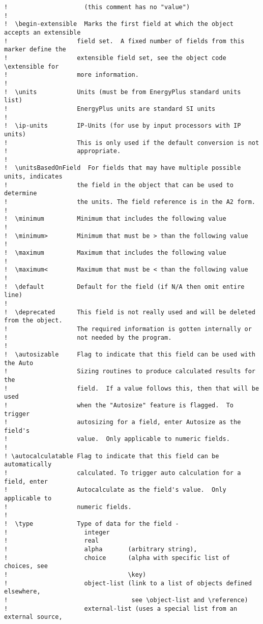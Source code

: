 \begin{lstlisting}
!                     (this comment has no "value")
!
!  \begin-extensible  Marks the first field at which the object accepts an extensible
!                   field set.  A fixed number of fields from this marker define the
!                   extensible field set, see the object code \extensible for
!                   more information.
!
!  \units           Units (must be from EnergyPlus standard units list)
!                   EnergyPlus units are standard SI units
!
!  \ip-units        IP-Units (for use by input processors with IP units)
!                   This is only used if the default conversion is not
!                   appropriate.
!
!  \unitsBasedOnField  For fields that may have multiple possible units, indicates
!                   the field in the object that can be used to determine
!                   the units. The field reference is in the A2 form.
!
!  \minimum         Minimum that includes the following value
!
!  \minimum>        Minimum that must be > than the following value
!
!  \maximum         Maximum that includes the following value
!
!  \maximum<        Maximum that must be < than the following value
!
!  \default         Default for the field (if N/A then omit entire line)
!
!  \deprecated      This field is not really used and will be deleted from the object.
!                   The required information is gotten internally or
!                   not needed by the program.
!
!  \autosizable     Flag to indicate that this field can be used with the Auto
!                   Sizing routines to produce calculated results for the
!                   field.  If a value follows this, then that will be used
!                   when the "Autosize" feature is flagged.  To trigger
!                   autosizing for a field, enter Autosize as the field's
!                   value.  Only applicable to numeric fields.
!
! \autocalculatable Flag to indicate that this field can be automatically
!                   calculated. To trigger auto calculation for a field, enter
!                   Autocalculate as the field's value.  Only applicable to
!                   numeric fields.
!
!  \type            Type of data for the field -
!                     integer
!                     real
!                     alpha       (arbitrary string),
!                     choice      (alpha with specific list of choices, see
!                                 \key)
!                     object-list (link to a list of objects defined elsewhere,
!                                  see \object-list and \reference)
!                     external-list (uses a special list from an external source,

\end{lstlisting}
